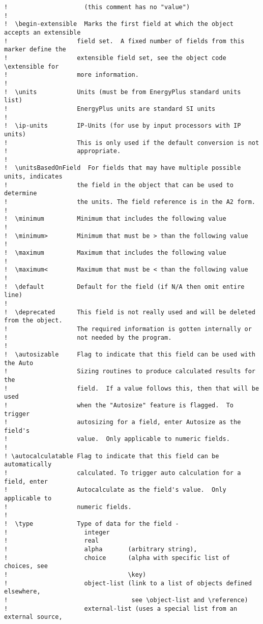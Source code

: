 \begin{lstlisting}
!                     (this comment has no "value")
!
!  \begin-extensible  Marks the first field at which the object accepts an extensible
!                   field set.  A fixed number of fields from this marker define the
!                   extensible field set, see the object code \extensible for
!                   more information.
!
!  \units           Units (must be from EnergyPlus standard units list)
!                   EnergyPlus units are standard SI units
!
!  \ip-units        IP-Units (for use by input processors with IP units)
!                   This is only used if the default conversion is not
!                   appropriate.
!
!  \unitsBasedOnField  For fields that may have multiple possible units, indicates
!                   the field in the object that can be used to determine
!                   the units. The field reference is in the A2 form.
!
!  \minimum         Minimum that includes the following value
!
!  \minimum>        Minimum that must be > than the following value
!
!  \maximum         Maximum that includes the following value
!
!  \maximum<        Maximum that must be < than the following value
!
!  \default         Default for the field (if N/A then omit entire line)
!
!  \deprecated      This field is not really used and will be deleted from the object.
!                   The required information is gotten internally or
!                   not needed by the program.
!
!  \autosizable     Flag to indicate that this field can be used with the Auto
!                   Sizing routines to produce calculated results for the
!                   field.  If a value follows this, then that will be used
!                   when the "Autosize" feature is flagged.  To trigger
!                   autosizing for a field, enter Autosize as the field's
!                   value.  Only applicable to numeric fields.
!
! \autocalculatable Flag to indicate that this field can be automatically
!                   calculated. To trigger auto calculation for a field, enter
!                   Autocalculate as the field's value.  Only applicable to
!                   numeric fields.
!
!  \type            Type of data for the field -
!                     integer
!                     real
!                     alpha       (arbitrary string),
!                     choice      (alpha with specific list of choices, see
!                                 \key)
!                     object-list (link to a list of objects defined elsewhere,
!                                  see \object-list and \reference)
!                     external-list (uses a special list from an external source,

\end{lstlisting}
